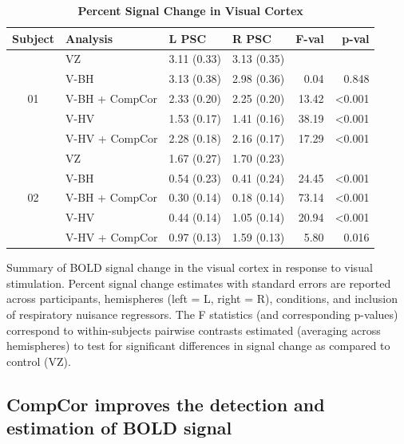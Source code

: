 \documentclass[9pt]{NEU502b-fmri}
\begin{document}
\begin{table}
\begin{center}
\begin{tabular}{c l l l r r}
\toprule
{Subject} & Analysis & L PSC & R PSC & F-val & p-val \\
\midrule
\multirow{5}{*}{01} & VZ          & 3.11 (0.33) & 3.13 (0.35) &       & \\
                    & V-BH           & 3.13 (0.38) & 2.98 (0.36) & 0.04  & 0.848\\
                    & V-BH + CompCor & 2.33 (0.20) & 2.25 (0.20) & 13.42 & <0.001\\
                    & V-HV           & 1.53 (0.17) & 1.41 (0.16) & 38.19 & <0.001\\
                    & V-HV + CompCor & 2.28 (0.18) & 2.16 (0.17) & 17.29 & <0.001\\\cline{2-6}
\multirow{5}{*}{02} & VZ          & 1.67 (0.27) & 1.70 (0.23) &       & \\
                    & V-BH           & 0.54 (0.23) & 0.41 (0.24) & 24.45 & <0.001\\
                    & V-BH + CompCor & 0.30 (0.14) & 0.18 (0.14) & 73.14 & <0.001\\
                    & V-HV           & 0.44 (0.14) & 1.05 (0.14) & 20.94 & <0.001\\
                    & V-HV + CompCor & 0.97 (0.13) & 1.59 (0.13) & 5.80 & 0.016 \\
\bottomrule
\end{tabular}
\end{center}
\caption{\textbf{Percent Signal Change in Visual Cortex}}
\par Summary of BOLD signal change in the visual cortex in response to visual stimulation. Percent signal change estimates with standard errors are reported across participants, hemispheres (left = L, right = R), conditions, and inclusion of respiratory nuisance regressors. The F statistics (and corresponding p-values) correspond to within-subjects pairwise contrasts estimated (averaging across hemispheres) to test for significant differences in signal change as compared to control (VZ).
\end{table}

\subsection{CompCor improves the detection and estimation of BOLD signal}
\end{document}
